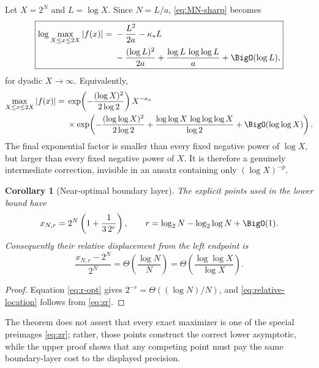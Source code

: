 \documentclass[11pt,oneside]{article}
\newtheorem{corollary}[theorem]{Corollary}
\theoremstyle{definition}
\theoremstyle{remark}
\begin{document}
Let $X=2^N$ and $L=\log X$.  Since $N=L/a$, \eqref{eq:MN-sharp} becomes
\begin{equation}
 \boxed{\begin{aligned}
 \log\max_{X\le x\le2X}|f(x)|
 ={}&-\frac{L^2}{2a}-\kappa_*L\\
 &-\frac{(\log L)^2}{2a}
 +\frac{\log L\,\log\log L}{a}
 +\BigO(\log L),
 \end{aligned}}                                             \label{eq:MX-sharp}
\end{equation}
for dyadic $X\to\infty$.  Equivalently,
\begin{equation}
 \begin{split}
 \max_{X\le x\le2X}|f(x)|
 ={}&\exp\!\left(-\frac{(\log X)^2}{2\log2}\right)
 X^{-\kappa_*}\\
 &\times\exp\!\left(
 -\frac{(\log\log X)^2}{2\log2}
 +\frac{\log\log X\,\log\log\log X}{\log2}
 +\BigO(\log\log X)\right).
 \end{split}                                                \label{eq:MX-multiplicative}
\end{equation}
The final exponential factor is smaller than every fixed negative power of
$\log X$, but larger than every fixed negative power of $X$.  It is therefore
a genuinely intermediate correction, invisible in an ansatz containing only
$(\log X)^{-p}$.

\begin{corollary}[Near-optimal boundary layer]
The explicit points used in the lower bound have
\begin{equation}
 x_{N,r}=2^N\left(1+\frac{1}{3\,2^r}\right),
 \qquad
 r=\log_2N-\log_2\log N+\BigO(1).                          \label{eq:near-opt-location}
\end{equation}
Consequently their relative displacement from the left endpoint is
\begin{equation}
 \frac{x_{N,r}-2^N}{2^N}
 =\Theta\!\left(\frac{\log N}{N}\right)
 =\Theta\!\left(\frac{\log\log X}{\log X}\right).         \label{eq:relative-location}
\end{equation}
\end{corollary}

\begin{proof}
Equation \eqref{eq:r-opt} gives $2^{-r}=\Theta((\log N)/N)$, and
\eqref{eq:relative-location} follows from \eqref{eq:zr}.
\end{proof}

The theorem does not assert that every exact maximizer is one of the special
preimages \eqref{eq:zr}; rather, those points construct the correct lower
asymptotic, while the upper proof shows that any competing point must pay the
same boundary-layer cost to the displayed precision.
\end{document}
